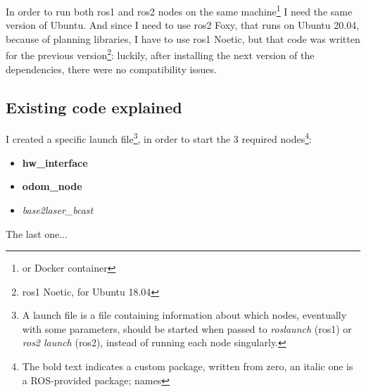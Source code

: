 In order to run both \Acrshort{ros1} and \Acrshort{ros2} nodes on the same machine\footnote{or Docker container} I need the same version of Ubuntu. And since I need to use \Acrshort{ros2} Foxy, that runs on Ubuntu 20.04, because of planning libraries, I have to use \Acrshort{ros1} Noetic, but that code was written for the previous version\footnote{\Acrshort{ros1} Noetic, for Ubuntu 18.04}: luckily, after installing the next version of the dependencies, there were no compatibility issues.

\subsection{Existing code explained}

I created a specific launch file\footnote{A launch file is a file containing information about which nodes, eventually with some parameters, should be started when passed to {\it roslaunch} (\Acrshort{ros1}) or {\it ros2 launch} (\Acrshort{ros2}), instead of running each node singularly.}, in order to start the 3 required nodes\footnote{The bold text indicates a custom package, written from zero, an italic one is a ROS-provided package; names}:

\begin{itemize}
    \item {\bf hw\_interface}
    \item {\bf odom\_node}
    \item {\it base2laser\_bcast}
\end{itemize}

The last one...